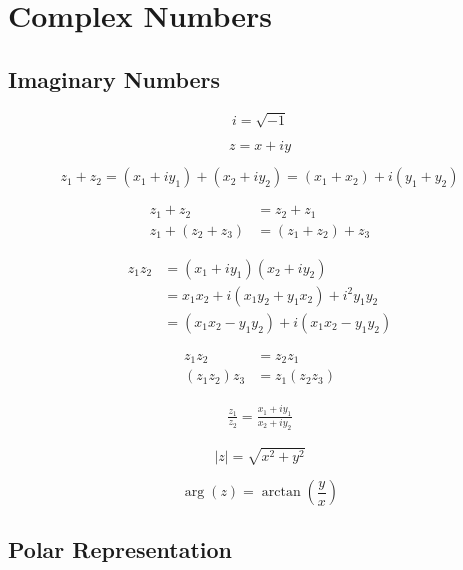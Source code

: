 \chapter{Complex Numbers}

\section{Imaginary Numbers}
\begin{equation*}
    i = \sqrt{-1}
\end{equation*}

\begin{equation*}
    z = x + iy
\end{equation*}

\begin{equation*}
    z_1 + z_2 = (x_1 + iy_1) + (x_2 + iy_2) = (x_1 + x_2) + i(y_1 + y_2)
\end{equation*}

\begin{align*}
    z_1 + z_2 &= z_2 + z_1\\
    z_1 + (z_2 + z_3) &= (z_1 + z_2) + z_3
\end{align*}

\begin{align*}
    z_1z_2 &= (x_1 + iy_1)(x_2 + iy_2)\\
    &= x_1x_2 + i(x_1y_2 + y_1x_2) + i^2 y_1y_2\\
    &= (x_1x_2 - y_1y_2) +i(x_1x_2 - y_1y_2)
\end{align*}

\begin{align*}
    z_1z_2 &= z_2z_1\\
    (z_1z_2)z_3 &= z_1(z_2z_3)
\end{align*}

\begin{align*}
    \frac{z_1}{z_2} = \frac{x_1 + iy_1}{x_2 + iy_2}
\end{align*}

\begin{equation*}
    |z| = \sqrt{x^2 + y^2}
\end{equation*}

\begin{equation*}
    \arg(z) = \arctan\left(\frac{y}{x}\right)
\end{equation*}

\section{Polar Representation}


